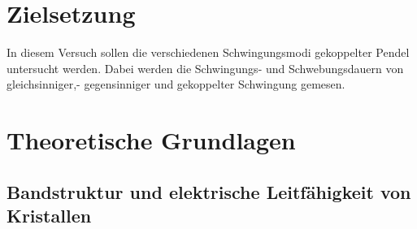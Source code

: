 \section{Zielsetzung}

In diesem Versuch sollen die verschiedenen Schwingungsmodi gekoppelter Pendel untersucht werden.
Dabei werden die Schwingungs- und Schwebungsdauern von gleichsinniger,- gegensinniger und gekoppelter Schwingung gemesen.

\section{Theoretische Grundlagen}

\subsection{Bandstruktur und elektrische Leitfähigkeit von Kristallen}

